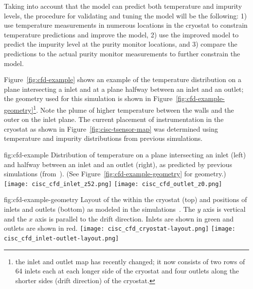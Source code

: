 
Taking into account that the  model can predict both temperature and impurity levels, the procedure for validating and tuning the  model will be the following: 1) use temperature measurements in numerous locations in the cryostat to constrain temperature predictions and  improve the  model, 2) use the improved model  to predict the \lar impurity level at the purity monitor locations, and 3) compare the predictions to the actual  purity monitor measurements to further constrain the  model.  

Figure~\ref{fig:cfd-example} shows an example of the temperature
distribution on a plane intersecting a  inlet and at a
plane halfway between an inlet and an outlet; 
the geometry used for
this simulation is shown in Figure~\ref{fig:cfd-example-geometry}\footnote{the inlet and outlet map has recently changed; it now consists of two rows of 64 inlets each at each longer side of the cryostat and four outlets along the shorter sides (drift direction) of the cryostat.}. Note the plume of higher temperature  between the walls and
the outer  on the inlet plane. The current placement of instrumentation in
the cryostat as shown in Figure~\ref{fig:cisc-tsensor-map} was determined using temperature and impurity distributions from previous simulations.

\begin{dunefigure}{fig:cfd-example}
  {Distribution of temperature on a plane intersecting an inlet (left) and halfway between an inlet and an outlet (right), as predicted by previous  simulations (from~\cite{bib:docdb5915}). (See Figure~\ref{fig:cfd-example-geometry} for geometry.)}
  \texttt{[image: cisc\_cfd\_inlet\_z52.png]}
  \texttt{[image: cisc\_cfd\_outlet\_z0.png]}
\end{dunefigure}

\begin{dunefigure}{fig:cfd-example-geometry}
  {Layout of the \single {} within the cryostat (top) and positions of  inlets and outlets (bottom) as modeled in the  simulations~\cite{bib:docdb5915}. The $y$ axis is vertical and the $x$ axis is parallel to the  drift direction. Inlets are shown in green and outlets are shown in red.}
  \texttt{[image: cisc\_cfd\_cryostat-layout.png]}
  \texttt{[image: cisc\_cfd\_inlet-outlet-layout.png]}
\end{dunefigure}

